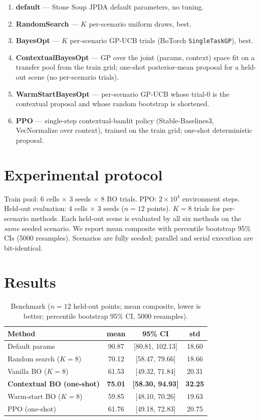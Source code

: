 \documentclass[11pt]{article}
\begin{document}
\begin{enumerate}
\item \textbf{default} --- Stone Soup JPDA default parameters, no tuning.
\item \textbf{RandomSearch} --- $K$ per-scenario uniform draws, best.
\item \textbf{BayesOpt} --- $K$ per-scenario GP-UCB trials (BoTorch
\texttt{SingleTaskGP}), best.
\item \textbf{ContextualBayesOpt} --- GP over the joint (params,
context) space fit on a transfer pool from the train grid; one-shot
posterior-mean proposal for a held-out scene (no per-scenario trials).
\item \textbf{WarmStartBayesOpt} --- per-scenario GP-UCB whose trial-0
is the contextual proposal and whose random bootstrap is shortened.
\item \textbf{PPO} --- single-step contextual-bandit policy
(Stable-Baselines3, VecNormalize over context), trained on the train
grid; one-shot deterministic proposal.
\end{enumerate}

\section{Experimental protocol}
\label{sec:protocol}

Train pool: 6 cells $\times$ 3 seeds $\times$ 8 BO trials. PPO:
$2{\times}10^4$ environment steps. Held-out evaluation: 4 cells $\times$
3 seeds ($n{=}12$ points). $K{=}8$ trials for per-scenario methods.
Each held-out scene is evaluated by all six methods on the \emph{same}
seeded scenario. We report mean composite with percentile bootstrap
95\% CIs (5000 resamples). Scenarios are fully seeded; parallel and
serial execution are bit-identical.

\section{Results}
\label{sec:results}

\begin{table}[h]
\centering
\caption{Benchmark ($n{=}12$ held-out points; mean composite, lower is
better; percentile bootstrap 95\% CI, 5000 resamples).}
\begin{tabular}{lccc}
\toprule
Method & mean & 95\% CI & std \\
\midrule
Default params & 90.87 & [80.81, 102.13] & 18.60 \\
Random search ($K{=}8$) & 70.12 & [58.47, 79.66] & 18.66 \\
Vanilla BO ($K{=}8$) & 61.53 & [49.32, 71.84] & 20.31 \\
\textbf{Contextual BO (one-shot)} & \textbf{75.01} &
\textbf{[58.30, 94.93]} & \textbf{32.25} \\
Warm-start BO ($K{=}8$) & 59.85 & [48.10, 70.26] & 19.63 \\
PPO (one-shot) & 61.76 & [49.18, 72.83] & 20.75 \\
\bottomrule
\end{tabular}
\label{tab:main}
\end{table}
\end{document}
